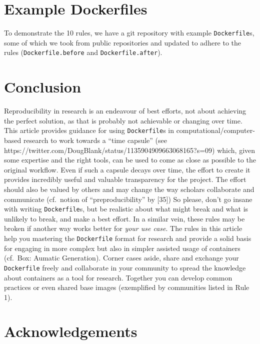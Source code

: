 \documentclass[10pt,letterpaper]{article}
\begin{document}
\hypertarget{example-dockerfiles}{%
\section{Example Dockerfiles}\label{example-dockerfiles}}

To demonstrate the 10 rules, we have a git repository with example
\texttt{Dockerfile}s, some of which we took from public repositories and
updated to adhere to the rules (\texttt{Dockerfile.before} and
\texttt{Dockerfile.after}).

\hypertarget{conclusion}{%
\section*{Conclusion}\label{conclusion}}

Reproducibility in research is an endeavour of best efforts, not about
achieving the perfect solution, as that is probably not achievable or
changing over time. This article provides guidance for using
\texttt{Dockerfile}s in computational/computer-based research to work
towards a ``time capsule'' (see
https://twitter.com/DougBlank/status/1135904909663068165?s=09) which,
given some expertise and the right tools, can be used to come as close
as possible to the original workflow. Even if such a capsule decays over
time, the effort to create it provides incredibly useful and valuable
transparency for the project. The effort should also be valued by others
and may change the way scholars collaborate and communicate (cf.~notion
of ``preproducibility'' by {[}35{]}) So please, don't go insane with
writing \texttt{Dockerfile}s, but be realistic about what might break
and what is unlikely to break, and make a best effort. In a similar
vein, these rules may be broken if another way works better for
\emph{your use case}. The rules in this article help you mastering the
\texttt{Dockerfile} format for research and provide a solid basis for
engaging in more complex but also in simpler assisted usage of
containers (cf.~Box: Aumatic Generation). Corner cases aside, share and
exchange your \texttt{Dockerfile} freely and collaborate in your
community to spread the knowledge about containers as a tool for
research. Together you can develop common practices or even shared base
images (exemplified by communities listed in Rule 1).

\hypertarget{acknowledgements}{%
\section*{Acknowledgements}\label{acknowledgements}}
\end{document}
